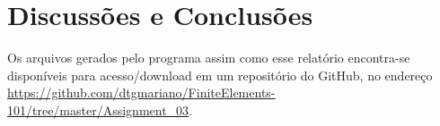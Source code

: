 \section{Discussões e Conclusões}
Os arquivos gerados pelo programa assim como esse relatório encontra-se disponíveis para acesso/download em um repositório do GitHub, no endereço \url{https://github.com/dtgmariano/FiniteElements-101/tree/master/Assignment_03}.
